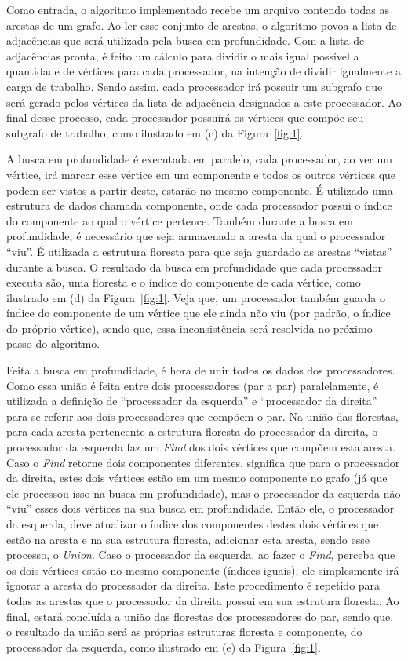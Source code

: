 \documentclass[12pt]{article}
\begin{document}
Como entrada, o algoritmo implementado recebe um arquivo contendo todas as arestas de um grafo. Ao ler esse conjunto de arestas, o algoritmo povoa a lista de adjacências que será utilizada pela busca em profundidade. Com a lista de adjacências pronta, é feito um cálculo para dividir o mais igual possível a quantidade de vértices para cada processador, na intenção de dividir igualmente a carga de trabalho. Sendo assim, cada processador irá possuir um subgrafo que será gerado pelos vértices da lista de adjacência designados a este processador. Ao final desse processo, cada processador possuirá os vértices que compõe seu subgrafo de trabalho, como ilustrado em (c) da Figura~\ref{fig:1}.

A busca em profundidade é executada em paralelo, cada processador, ao ver um vértice, irá marcar esse vértice em um componente e todos os outros vértices que podem ser vistos a partir deste, estarão no mesmo componente. É utilizado uma estrutura de dados chamada componente, onde cada processador possui o índice do componente ao qual o vértice pertence. Também durante a busca em profundidade, é necessário que seja armazenado a aresta da qual o processador “viu”. É utilizada a estrutura floresta para que seja guardado as arestas “vistas” durante a busca. O resultado da busca em profundidade que cada processador executa são, uma floresta e o índice do componente de cada vértice, como ilustrado em (d) da Figura~\ref{fig:1}. Veja que, um processador também guarda o índice do componente de um vértice que ele ainda não viu (por padrão, o índice do próprio vértice), sendo que, essa inconsistência será resolvida no próximo passo do algoritmo.

\newpage
Feita a busca em profundidade, é hora de unir todos os dados dos processadores. Como essa união é feita entre dois processadores (par a par) paralelamente, é utilizada a definição de “processador da esquerda” e “processador da direita” para se referir aos dois processadores que compõem o par. Na união das florestas, para cada aresta pertencente a estrutura floresta do processador da direita, o processador da esquerda faz um \emph{Find} dos dois vértices que compõem esta aresta. Caso o \emph{Find} retorne dois componentes diferentes, significa que para o processador da direita, estes dois vértices estão em um mesmo componente no grafo (já que ele processou isso na busca em profundidade), mas o processador da esquerda não “viu” esses dois vértices na sua busca em profundidade. Então ele, o processador da esquerda, deve atualizar o índice dos componentes destes dois vértices que estão na aresta e na sua estrutura floresta, adicionar esta aresta, sendo esse processo, o \emph{Union}. Caso o processador da esquerda, ao fazer o \emph{Find}, perceba que os dois vértices estão no mesmo componente (índices iguais), ele simplesmente irá ignorar a aresta do processador da direita. Este procedimento é repetido para todas as arestas que o processador da direita possui em sua estrutura floresta. Ao final, estará concluída a união das florestas dos processadores do par, sendo que, o resultado da união será as próprias estruturas floresta e componente, do processador da esquerda, como ilustrado em (e) da Figura~\ref{fig:1}.
\end{document}
